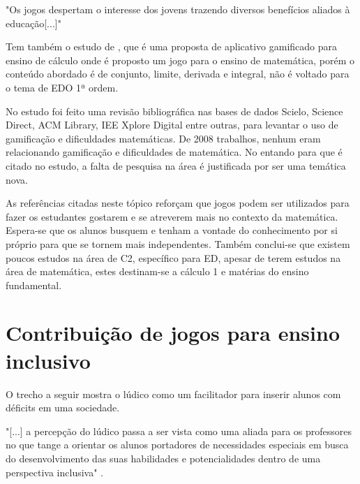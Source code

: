 "Os jogos despertam o interesse dos jovens trazendo diversos benefícios aliados à
educação[...]" \cite{appcalculo}

\begin{comment}
Gamificação foca em elementos como desafios, níveis, avatar, conquistas, histórias, pontos (Gustavo Fortes Tondello, PhD). Esses elementos são utilizados para engajamento do jogador.

Completar missões e derrotar um chefão faz o jogador se sentir competente (Gustavo Fortes Tondello, PhD).
Ser capaz de escolher diferentes caminhos ou criar coisas diferentes faz o jogador se sentir autônomo (Gustavo Fortes Tondello, PhD).
\end{comment}

Tem também o estudo de \cite{appcalculo}, que é uma proposta de aplicativo gamificado para ensino de cálculo onde é proposto um jogo para o ensino de matemática, porém o conteúdo abordado é de conjunto, limite, derivada e integral, não é voltado para o tema de EDO 1ª ordem.

No estudo \cite{revbibmatgam} foi feito uma revisão bibliográfica nas bases de dados Scielo, Science Direct, ACM Library, IEE Xplore Digital entre outras, para levantar o uso de gamificação e dificuldades matemáticas. De 2008 trabalhos, nenhum eram relacionando gamificação e dificuldades de matemática. No entando para \cite{dicheva} que é citado no estudo, a falta de pesquisa na área é justificada por ser uma temática nova.

As referências citadas neste tópico reforçam que jogos podem ser utilizados para fazer os estudantes gostarem e se atreverem mais no contexto da matemática. Espera-se que os alunos busquem e tenham a vontade do conhecimento por si próprio para que se tornem mais independentes. Também conclui-se que existem poucos estudos na área de C2, específico para ED, apesar de terem estudos na área de matemática, estes destinam-se a cálculo 1 e matérias do ensino fundamental.

\section[Contribuição de jogos para ensino inclusivo]{Contribuição de jogos para ensino inclusivo}

O trecho a seguir mostra o lúdico como um facilitador para inserir alunos com déficits em uma sociedade. 

"[...] a percepção do lúdico passa a ser vista como uma aliada para os professores no que tange a orientar os alunos portadores de necessidades especiais em busca do desenvolvimento das suas habilidades e potencialidades dentro de uma perspectiva inclusiva"  \cite{jogoPratPedagoc}.


